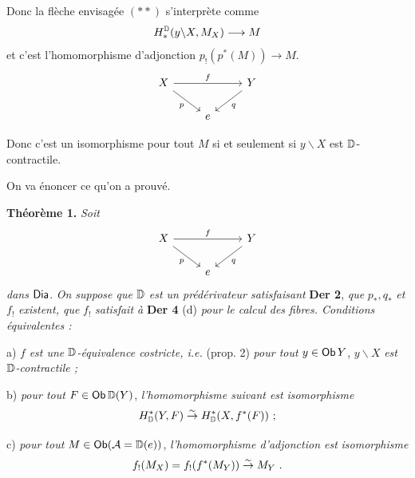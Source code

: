 \dgrchunkbegin


\noindent Donc la flèche envisagée $(**)$ s'interprète comme
\[
H_*^{\mathbb{D}}(y\backslash X, M_X) \longrightarrow M
\]
et c'est l'homomorphisme d'adjonction $p_!(p^*(M)) \to M$.
\[
\begin{tikzcd}
X \arrow[rr, "f"] \arrow[dr, "p"{swap}] & & Y \arrow[dl, "q"] \\
& e &
\end{tikzcd}
\]

\noindent Donc c'est un isomorphisme pour tout $M$ si et seulement si $y\backslash X$ est $\mathbb{D}$-contractile.

\noindent On va énoncer ce qu'on a prouvé.

\noindent\textbf{Théorème 1.} \textit{Soit}
\[
\begin{tikzcd}
X \arrow[rr, "f"] \arrow[dr, "p"{swap}] & & Y \arrow[dl, "q"] \\
& e &
\end{tikzcd}
\]
\textit{dans} $\mathsf{Dia}$. \textit{On suppose que} $\mathbb{D}$ \textit{est un prédérivateur satisfaisant} \textbf{Der 2}, \textit{que} $p_*, q_*$ \textit{et} $f_!$ \textit{existent, que} $f_!$ \textit{satisfait à} \textbf{Der 4} (d) \textit{pour le calcul des fibres. Conditions équivalentes :}

a) $f$ \textit{est une} $\mathbb{D}$\textit{-équivalence costricte, i.e.} (prop. 2) \textit{pour tout} $y \in \mathsf{Ob}\, Y$, $y\backslash X$ \textit{est} $\mathbb{D}$\textit{-contractile ;}

b) \textit{pour tout} $F \in \mathsf{Ob}\, \mathbb{D}(Y)$, \textit{l'homomorphisme suivant est} \textit{isomorphisme}
\[
H^*_{\mathbb{D}}(Y, F) \overset{\sim}{\to} H^*_{\mathbb{D}}(X, f^*(F)) \ ;
\]

c) \textit{pour tout} $M \in \mathsf{Ob}(\mathcal{A} = \mathbb{D}(e))$, \textit{l'homomorphisme d'adjonction est} \textit{isomorphisme}
\[
f_!(M_X) = f_!(f^*(M_Y)) \overset{\sim}{\to} M_Y \ .
\]

